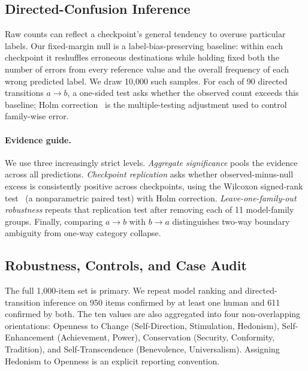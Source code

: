 \documentclass[runningheads,a4paper]{llncs}
\begin{document}
\subsection{Directed-Confusion Inference}

Raw counts can reflect a checkpoint's general tendency to overuse particular labels. Our fixed-margin null is a label-bias-preserving baseline: within each checkpoint it reshuffles erroneous destinations while holding fixed both the number of errors from every reference value and the overall frequency of each wrong predicted label. We draw 10,000 such samples. For each of 90 directed transitions $a\rightarrow b$, a one-sided test asks whether the observed count exceeds this baseline; Holm correction~\cite{holm1979} is the multiple-testing adjustment used to control family-wise error.

\paragraph{Evidence guide.}
We use three increasingly strict levels. \emph{Aggregate significance} pools the evidence across all predictions. \emph{Checkpoint replication} asks whether observed-minus-null excess is consistently positive across checkpoints, using the Wilcoxon signed-rank test~\cite{wilcoxon1945} (a nonparametric paired test) with Holm correction. \emph{Leave-one-family-out robustness} repeats that replication test after removing each of 11 model-family groups. Finally, comparing $a\rightarrow b$ with $b\rightarrow a$ distinguishes two-way boundary ambiguity from one-way category collapse.

\subsection{Robustness, Controls, and Case Audit}

The full 1,000-item set is primary. We repeat model ranking and directed-transition inference on 950 items confirmed by at least one human and 611 confirmed by both. The ten values are also aggregated into four non-overlapping orientations: Openness to Change (Self-Direction, Stimulation, Hedonism), Self-Enhancement (Achievement, Power), Conservation (Security, Conformity, Tradition), and Self-Transcendence (Benevolence, Universalism). Assigning Hedonism to Openness is an explicit reporting convention.
\end{document}
